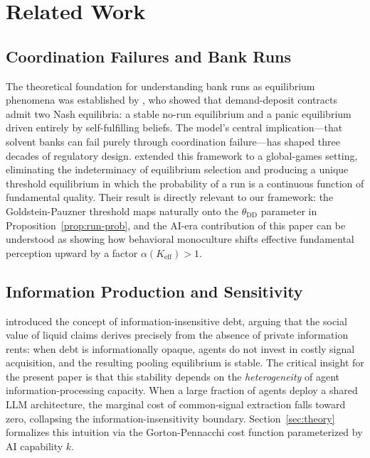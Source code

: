 \section{Related Work}
\label{sec:related}

\subsection{Coordination Failures and Bank Runs}

The theoretical foundation for understanding bank runs as equilibrium phenomena was established by \citet{diamond1983bank}, who showed that demand-deposit contracts admit two Nash equilibria: a stable no-run equilibrium and a panic equilibrium driven entirely by self-fulfilling beliefs. The model's central implication---that solvent banks can fail purely through coordination failure---has shaped three decades of regulatory design. \citet{goldstein2005demand} extended this framework to a global-games setting, eliminating the indeterminacy of equilibrium selection and producing a unique threshold equilibrium in which the probability of a run is a continuous function of fundamental quality. Their result is directly relevant to our framework: the Goldstein-Pauzner threshold maps naturally onto the $\theta_{\text{DD}}$ parameter in Proposition~\ref{prop:run-prob}, and the AI-era contribution of this paper can be understood as showing how behavioral monoculture shifts effective fundamental perception upward by a factor $\alpha(K_{\text{eff}}) > 1$.


\subsection{Information Production and Sensitivity}

\citet{gorton1990financial} introduced the concept of information-insensitive debt, arguing that the social value of liquid claims derives precisely from the absence of private information rents: when debt is informationally opaque, agents do not invest in costly signal acquisition, and the resulting pooling equilibrium is stable. The critical insight for the present paper is that this stability depends on the \emph{heterogeneity} of agent information-processing capacity. When a large fraction of agents deploy a shared LLM architecture, the marginal cost of common-signal extraction falls toward zero, collapsing the information-insensitivity boundary. Section~\ref{sec:theory} formalizes this intuition via the Gorton-Pennacchi cost function parameterized by AI capability $k$.

